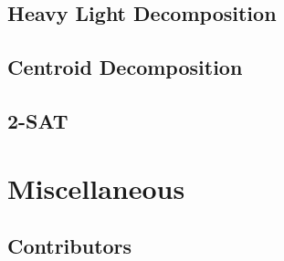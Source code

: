 \documentclass{article}
\begin{document}
\subsection{Heavy Light Decomposition}
\subsection{Centroid Decomposition}
\subsection{2-SAT}



\section{Miscellaneous}

\subsection{Contributors}



\printbibliography[heading=bibintoc]
	
\end{document}
